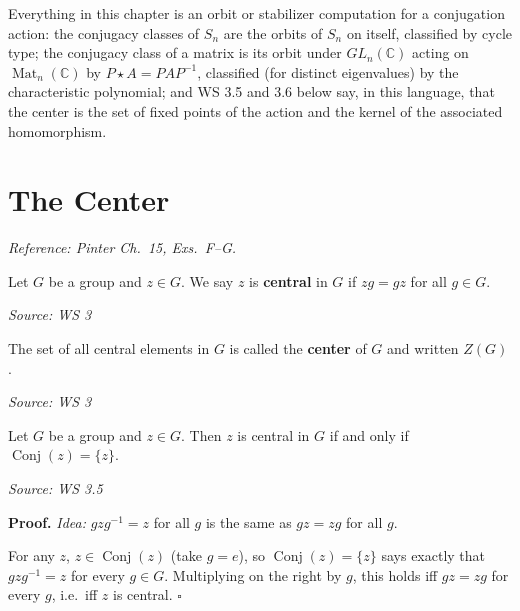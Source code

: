 \documentclass[11pt]{report}
\renewenvironment{proof}[1][Proof]{\noindent\textbf{#1.} }{\hfill$\square$\par\vspace{5pt}}
\newcommand{\srcline}[1]{\par\hfill{\footnotesize\textit{Source: #1}}}
\begin{document}
\begin{rembox}\label{rem:reading-chapter-through-actions}
Everything in this chapter is an orbit or stabilizer computation for a conjugation action: the conjugacy classes of $S_n$ are the orbits of $S_n$ on itself, classified by cycle type; the conjugacy class of a matrix is its orbit under $GL_n(\mathbb{C})$ acting on $\operatorname{Mat}_n(\mathbb{C})$ by $P \star A = PAP^{-1}$, classified (for distinct eigenvalues) by the characteristic polynomial; and WS 3.5 and 3.6 below say, in this language, that the center is the set of fixed points of the action and the kernel of the associated homomorphism.
\end{rembox}

\section{The Center}\label{sec:center}

\textit{Reference: Pinter Ch.\ 15, Exs.\ F--G.}

\begin{defbox}\label{def:central-elements-center-z-g}
Let $G$ be a group and $z \in G$. We say $z$ is \textbf{central} in $G$ if $zg = gz$ for all $g \in G$.
\srcline{WS 3}
\end{defbox}

\begin{defbox}\label{def:center-z-g}
The set of all central elements in $G$ is called the \textbf{center} of $G$ and written $Z(G)$.
\srcline{WS 3}
\end{defbox}

\begin{propbox}\label{prop:central-iff-singleton-conjugacy-class}
Let $G$ be a group and $z \in G$. Then $z$ is central in $G$ if and only if $\operatorname{Conj}(z) = \{z\}$.
\srcline{WS 3.5}
\end{propbox}

\begin{proof}
\textit{Idea:} $gzg^{-1} = z$ for all $g$ is the same as $gz = zg$ for all $g$.\par
For any $z$, $z \in \operatorname{Conj}(z)$ (take $g = e$), so $\operatorname{Conj}(z) = \{z\}$ says exactly that $gzg^{-1} = z$ for every $g \in G$. Multiplying on the right by $g$, this holds iff $gz = zg$ for every $g$, i.e.\ iff $z$ is central.
\end{proof}
\end{document}
